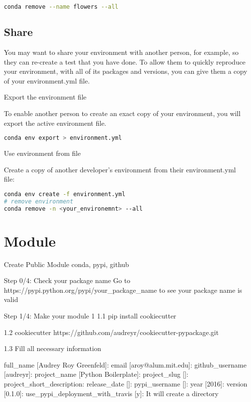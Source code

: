 \begin{lstlisting}[language=bash]
conda remove --name flowers --all
\end{lstlisting}

\subsection{Share}

You may want to share your environment with another person, for example, so they can re-create a test that you have done. To allow them to quickly reproduce your environment, with all of its packages and versions, you can give them a copy of your environment.yml file.

Export the environment file

To enable another person to create an exact copy of your environment, you will export the active environment file.

\begin{lstlisting}[language=bash]
conda env export > environment.yml
\end{lstlisting}

Use environment from file

Create a copy of another developer’s environment from their environment.yml file:

\begin{lstlisting}[language=bash]
conda env create -f environment.yml
# remove environment
conda remove -n <your_environemnt> --all
\end{lstlisting}



\section{Module}


Create Public Module
conda, pypi, github

Step 0/4: Check your package name
Go to https://pypi.python.org/pypi/your_package_name to see your package name is valid

Step 1/4: Make your module 1
1.1 pip install cookiecutter

1.2 cookiecutter https://github.com/audreyr/cookiecutter-pypackage.git

1.3 Fill all necessary information

full_name [Audrey Roy Greenfeld]:
email [aroy@alum.mit.edu]:
github_username [audreyr]:
project_name [Python Boilerplate]:
project_slug []:
project_short_description:
release_date []:
pypi_username []:
year [2016]:
version [0.1.0]:
use_pypi_deployment_with_travis [y]:
It will create a directory

